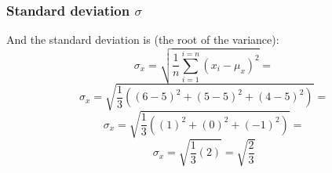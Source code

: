 \subsubsection{Standard deviation $\sigma$}
And the standard deviation is (the root of the variance):
\begin{equation}
    \sigma_x=\sqrt{\frac{1}{n}\sum_{i=1}^{i=n}{({x_i}-\mu_x)}^2}=
\end{equation}
\begin{equation}
    \sigma_x=\sqrt{\frac{1}{3}({(6-5)}^2+{(5-5)}^2+{(4-5)}^2)}=
\end{equation}
\begin{equation}
    \sigma_x=\sqrt{\frac{1}{3}({(1)}^2+{(0)}^2+{(-1)}^2)}=
\end{equation}
\begin{equation}
    \sigma_x=\sqrt{\frac{1}{3}(2)}=\sqrt{\frac{2}{3}}
\end{equation}
